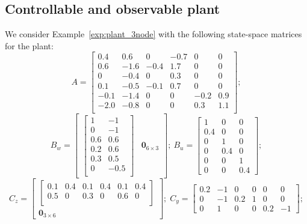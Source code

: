 \subsection{Controllable and observable plant}
We consider Example~\ref{exp:plant_3node} with the following state-space matrices for the plant:
\begin{equation*}
A = 
\begin{bmatrix}
 0.4 & 0.6 & 0 & -0.7  &  0 &  0 \\
0.6  & -1.6 &   -0.4 & 1.7 &  0 &  0 \\
 0 &  -0.4 & 0  &  0.3  & 0  & 0 \\
 0.1  & -0.5  & -0.1  &  0.7 & 0 &  0 \\
-0.1 &  -1.4 & 0  & 0 &   -0.2  &  0.9 \\
-2.0  & -0.8 & 0  & 0 &   0.3  &  1.1 \\
\end{bmatrix};
\end{equation*}
\begin{equation*}  
B_w = 
\begin{bmatrix}
\begin{bmatrix}
1 & -1\\
0 & -1\\
0.6 & 0.6 \\
0.2 & 0.6\\
0.3 & 0.5\\
0 & -0.5\\
\end{bmatrix} & \mathbf{0}_{6\times 3}
\end{bmatrix};\  B_u = \begin{bmatrix}
    1 & 0 & 0 \\
    0.4 & 0 & 0\\
    0 & 1 & 0\\
    0 & 0.4 & 0\\
    0 & 0 & 1 \\
    0 & 0 & 0.4
\end{bmatrix};
\end{equation*}
\begin{equation*}
    C_z = \begin{bmatrix}
        \begin{bmatrix}
    0.1 & 0.4 & 0.1 & 0.4 & 0.1 & 0.4 \\
    0.5 & 0 & 0.3 & 0 & 0.6 & 0 \\
\end{bmatrix} \\
\mathbf{0}_{3\times 6}
\end{bmatrix};\; C_y = \begin{bmatrix}
    0.2 & -1 & 0 & 0 & 0 & 0 \\
    0 & -1 & 0.2 & 1 & 0 & 0\\
    0 & 1 & 0 & 0 & 0.2 & -1
    \end{bmatrix}; 
\end{equation*}
